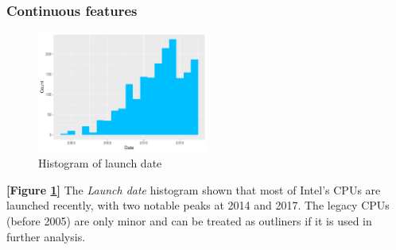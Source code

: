 \subsubsection{Continuous features}

\begin{figure}[H]
    \centering
    \includegraphics[width=0.5\textwidth]{./graphics/hist_ldate.pdf}
    \caption{Histogram of launch date}
    \label{fig:hist_ldate}
\end{figure}

\textbf{[Figure \ref{fig:hist_ldate}]} The \textit{Launch date} histogram shown that most of Intel's CPUs are launched recently, with two notable peaks at 2014 and 2017. The legacy
CPUs (before 2005) are only minor and can be treated as outliners if it is used in further analysis.


